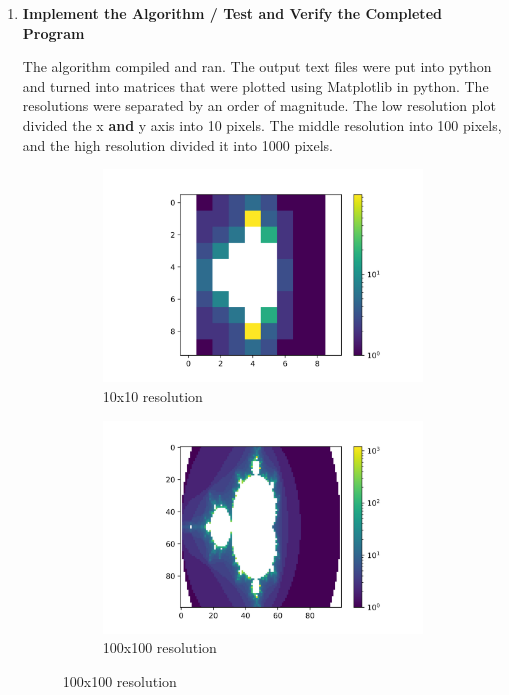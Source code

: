 \documentclass[12pt]{exam}
\begin{document}
\begin{enumerate}
            \item \textbf{Implement the Algorithm / Test and Verify the Completed Program}
            
                The algorithm compiled and ran. The output text files were put into python and turned into matrices that were plotted using Matplotlib in python. The resolutions were separated by an order of magnitude. The low resolution plot divided the x \textbf{and} y axis into 10 pixels. The middle resolution into 100 pixels, and the high resolution divided it into 1000 pixels. 

                \begin{figure}
                    \centering

                        \begin{subfigure}[b]{0.47\textwidth}
                        \includegraphics[width=\textwidth]{Low.png}\hfill
                        \caption{10x10 resolution}
                        \label{fig:low-res}
                        \end{subfigure}
                        \hfill
                        \begin{subfigure}[b]{0.47\textwidth}
                            \includegraphics[width=\textwidth]{Mid.png}\hfill
                            \caption{100x100 resolution}
                            \label{fig:mid-res}
                        \end{subfigure}


\end{figure}
\end{enumerate}
\end{document}
